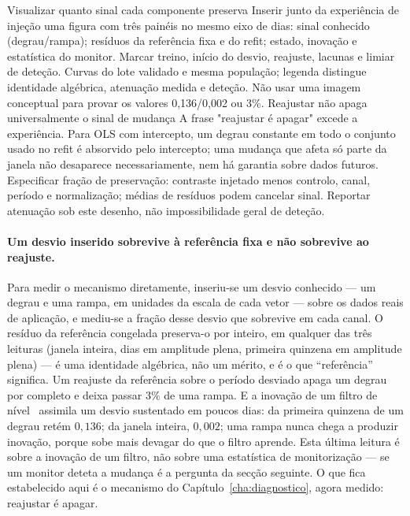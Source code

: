{Visualizar quanto sinal cada componente preserva}
{Inserir junto da experiência de injeção uma figura com três painéis
no mesmo eixo de dias: sinal conhecido (degrau/rampa); resíduos da
referência fixa e do refit; estado, inovação e estatística do monitor.
Marcar treino, início do desvio, reajuste, lacunas e limiar de deteção.
Curvas do lote validado e mesma população; legenda distingue identidade
algébrica, atenuação medida e deteção. Não usar uma imagem conceptual
para provar os valores 0,136/0,002 ou 3\%.}%
{Reajustar não apaga universalmente o sinal de mudança}
{A frase "reajustar é apagar" excede a experiência. Para OLS com
intercepto, um degrau constante em todo o conjunto usado no refit é
absorvido pelo intercepto; uma mudança que afeta só parte da janela
não desaparece necessariamente, nem há garantia sobre dados futuros.
Especificar fração de preservação: contraste injetado menos controlo,
canal, período e normalização; médias de resíduos podem cancelar sinal.
Reportar atenuação sob este desenho, não impossibilidade geral de deteção.}%
\paragraph{Um desvio inserido sobrevive à referência fixa e não sobrevive ao
reajuste.} Para medir o mecanismo diretamente, inseriu-se um desvio
conhecido --- um degrau e uma rampa, em unidades da escala de cada vetor
--- sobre os dados reais de aplicação, e mediu-se a fração desse desvio que
sobrevive em cada canal. O resíduo da referência congelada preserva-o por
inteiro, em qualquer das três leituras (janela inteira, dias em amplitude
plena, primeira quinzena em amplitude plena) --- é uma identidade algébrica,
não um mérito, e é o que ``referência'' significa. Um reajuste da referência
sobre o período desviado apaga um degrau por completo e deixa passar $3\%$
de uma rampa. E a inovação de um filtro de nível~\cite{DurbinKoopman2012} assimila um
desvio sustentado em poucos dias: da primeira quinzena de um degrau retém
$0{,}136$; da janela inteira, $0{,}002$; uma rampa nunca chega a produzir
inovação, porque sobe mais devagar do que o filtro aprende. Esta última
leitura é sobre a inovação de um filtro, não sobre uma estatística de
monitorização --- se um monitor deteta a mudança é a pergunta da secção
seguinte. O que fica estabelecido aqui é o mecanismo do
Capítulo~\ref{cha:diagnostico}, agora medido: reajustar é apagar.

